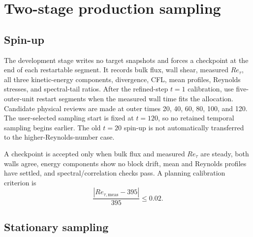 \documentclass[11pt]{article}
\begin{document}
\section{Two-stage production sampling}

\subsection{Spin-up}

The development stage writes no target snapshots and forces a checkpoint at
the end of each restartable segment.  It records bulk flux, wall shear,
measured $Re_{\tau}$, all three kinetic-energy components, divergence, CFL,
mean profiles, Reynolds stresses, and spectral-tail ratios.  After the
refined-step $t=1$ calibration, use five-outer-unit restart segments when the
measured wall time fits the allocation.  Candidate physical reviews are made
at outer times 20, 40, 60, 80, 100, and 120.  The user-selected
sampling start is fixed at $t=120$, so no retained temporal sampling begins
earlier.  The old $t=20$ spin-up is not automatically transferred to the
higher-Reynolds-number case.

A checkpoint is accepted only when bulk flux and measured $Re_{\tau}$ are
steady, both walls agree, energy components show no block drift, mean and
Reynolds profiles have settled, and spectral/correlation checks pass.  A
planning calibration criterion is
\begin{equation}
  \frac{|Re_{\tau,\mathrm{meas}}-395|}{395}\le0.02.
  \label{eq:retau_tolerance}
\end{equation}

\subsection{Stationary sampling}
\end{document}
